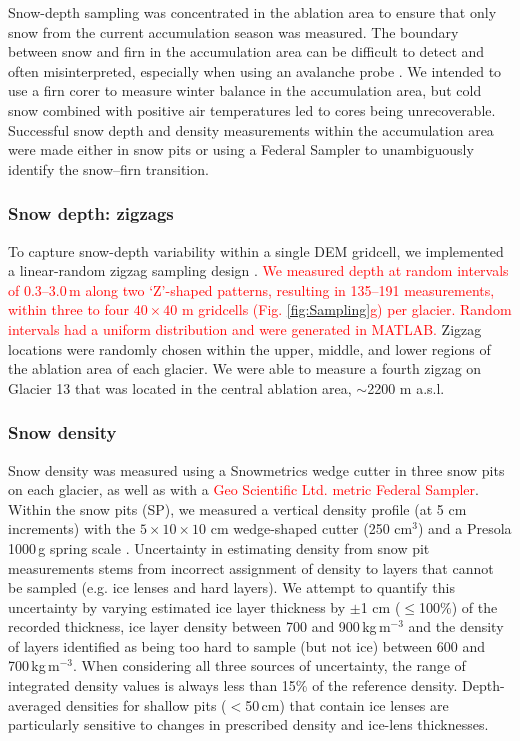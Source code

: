 \documentclass[review,oneside, letterpaper]{igs}
\begin{document}
Snow-depth sampling was concentrated in the ablation area to ensure that only snow from the current accumulation season was measured. The boundary between snow and firn in the accumulation area can be difficult to detect and often misinterpreted, especially when using an avalanche probe \citep{Grunewald2010,Sold2013}. We intended to use a firn corer to measure winter balance in the accumulation area, but cold snow combined with positive air temperatures led to cores being unrecoverable. Successful snow depth and density measurements within the accumulation area were made either in snow pits or using a Federal Sampler to unambiguously identify the snow--firn transition. 

\subsubsection{Snow depth: zigzags}

To capture snow-depth variability within a single DEM gridcell, we implemented a linear-random zigzag sampling design \citep{Shea2010}. \textcolor{red}{We measured depth at random intervals of 0.3--3.0\,m along two `Z'-shaped patterns, resulting in 135--191 measurements, within three to four $40\times40$ m gridcells (Fig. \ref{fig:Sampling}g) per glacier. Random intervals had a uniform distribution and were generated in MATLAB.} Zigzag locations were randomly chosen within the upper, middle, and lower regions of the ablation area of each glacier. We were able to measure a fourth zigzag on Glacier 13 that was located in the central ablation area, $\sim$2200 m a.s.l.

\subsubsection{Snow density}

Snow density was measured using a Snowmetrics wedge cutter in three snow pits on each glacier, as well as with a \textcolor{red}{Geo Scientific Ltd. metric Federal Sampler}. Within the snow pits (SP), we measured a vertical density profile (at 5 cm increments) with the $5\times10\times 10$ cm wedge-shaped cutter (250 cm$^3$) and a Presola 1000\,g spring scale \citep[e.g.][]{Gray1981,Fierz2009}. Uncertainty in estimating density from snow pit measurements stems from incorrect assignment of density to layers that cannot be sampled (e.g. ice lenses and hard layers). We attempt to quantify this uncertainty by varying estimated ice layer thickness by $\pm$1 cm ($\leq$100\%) of the recorded thickness, ice layer density between 700 and 900\,kg\,m$^{-3}$ and the density of layers identified as being too hard to sample (but not ice) between 600 and 700\,kg\,m$^{-3}$. When considering all three sources of uncertainty, the range of integrated density values is always less than 15\% of the reference density. Depth-averaged densities for shallow pits ($<$50\,cm) that contain ice lenses are particularly sensitive to changes in prescribed density and ice-lens thicknesses. 
\end{document}
